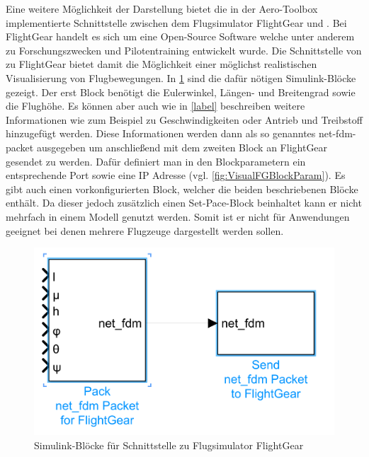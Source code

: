 Eine weitere Möglichkeit der Darstellung bietet die in der Aero-Toolbox implementierte Schnittstelle zwischen dem Flugsimulator FlightGear und \MatSim \cite{FGBlockDoku}. Bei FlightGear handelt es sich um eine Open-Source Software welche unter anderem zu Forschungszwecken und Pilotentraining entwickelt wurde. Die Schnittstelle von \MatSim zu FlightGear bietet damit die Möglichkeit einer möglichst realistischen Visualisierung von Flugbewegungen.
In \ref{fig:VisualFGBlock} sind die dafür nötigen Simulink-Blöcke gezeigt. Der erst Block benötigt die Eulerwinkel, Längen- und Breitengrad sowie die Flughöhe. Es können aber auch wie in \ref{label} beschreiben weitere Informationen wie zum Beispiel zu Geschwindigkeiten oder Antrieb und Treibstoff hinzugefügt werden.
Diese Informationen werden dann als so genanntes net-fdm-packet ausgegeben um anschließend mit dem zweiten Block an FlightGear gesendet zu werden. Dafür definiert man in den Blockparametern ein entsprechende Port sowie eine IP Adresse (vgl. \ref{fig:VisualFGBlockParam}).
Es gibt auch einen vorkonfigurierten Block, welcher die beiden beschriebenen Blöcke enthält. Da dieser jedoch zusätzlich einen Set-Pace-Block beinhaltet kann er nicht mehrfach in einem \MatSim Modell genutzt werden. Somit ist er nicht für Anwendungen geeignet bei denen mehrere Flugzeuge dargestellt werden sollen.
\begin{figure}[h]
	\centering
	\includegraphics[width=\textwidth]{./Bilder/Visual_FGBlock.png}
	\caption{Simulink-Blöcke für Schnittstelle zu Flugsimulator FlightGear}
	\label{fig:VisualFGBlock}
\end{figure}

